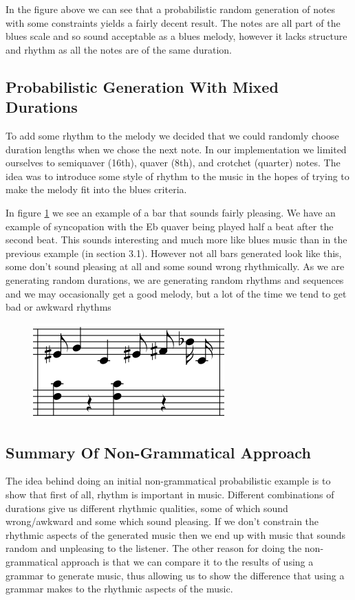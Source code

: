 \documentclass[pdftex,12pt,a4paper]{report}
\begin{document}
In the figure above we can see that a probabilistic random generation of notes with some constraints yields a fairly decent result. The notes are all part of the blues scale and so sound acceptable as a blues melody, however it lacks structure and rhythm as all the notes are of the same duration. 

\subsection{Probabilistic Generation With Mixed Durations}
To add some rhythm to the melody we decided that we could randomly choose duration lengths when we chose the next note. In our implementation we limited ourselves to semiquaver (16th), quaver (8th), and crotchet (quarter) notes. The idea was to introduce some style of rhythm to the music in the hopes of trying to make the melody fit into the blues criteria.

In figure \ref{fig:probabilisticgenerationwithdifferentdurations} we see an example of a bar that sounds fairly pleasing. We have an example of syncopation with the Eb quaver being played half a beat after the second beat. This sounds interesting and much more like blues music than in the previous example (in section 3.1). However not all bars generated look like this, some don't sound pleasing at all and some sound wrong rhythmically. As we are generating random durations, we are generating random rhythms and sequences and we may occasionally get a good melody, but a lot of the time we tend to get bad or awkward rhythms

\begin{figure}[here]
  \centering
  \includegraphics[scale=0.6]{figure/randomgenerationdifferentdurations.png}
  \label{fig:probabilisticgenerationwithdifferentdurations}
\end{figure}

\subsection{Summary Of Non-Grammatical Approach}
The idea behind doing an initial non-grammatical probabilistic example is to show that first of all, rhythm is important in music. Different combinations of durations give us different rhythmic qualities, some of which sound wrong/awkward and some which sound pleasing. If we don't constrain the rhythmic aspects of the generated music then we end up with music that sounds random and unpleasing to the listener.
The other reason for doing the non-grammatical approach is that we can compare it to the results of using a grammar to generate music, thus allowing us to show the difference that using a grammar makes to the rhythmic aspects of the music.
\end{document}

